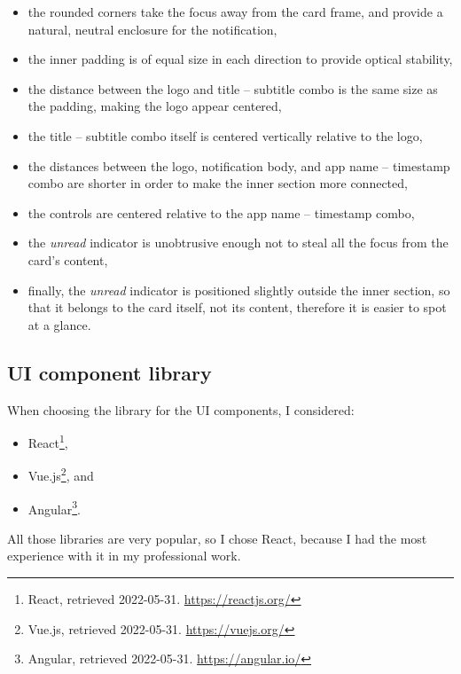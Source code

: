 \begin{itemize}
	\item
	      the rounded corners take the focus away from the card frame, and
	      provide a natural, neutral enclosure for the notification,
	\item
	      the inner padding is of equal size in each direction to provide
	      optical stability,
	\item
	      the distance between the logo and title -- subtitle combo is the same
	      size as the padding, making the logo appear centered,
	\item
	      the title -- subtitle combo itself is centered vertically relative to
	      the logo,
	\item
	      the distances between the logo, notification body, and app name --
	      timestamp combo are shorter in order to make the inner section more
	      connected,
	\item
	      the controls are centered relative to the app name -- timestamp combo,
	\item
	      the \emph{unread} indicator is unobtrusive enough not to steal all the
	      focus from the card's content,
	\item
	      finally, the \emph{unread} indicator is positioned slightly outside
	      the inner section, so that it belongs to the card itself, not its
	      content, therefore it is easier to spot at a glance.
\end{itemize}

\hypertarget{ui-component-library}{%
	\subsection{UI component library}\label{ui-component-library}}

When choosing the library for the UI components, I considered:

\begin{itemize}
	\item
	      React\footnote{React, retrieved 2022-05-31. \url{https://reactjs.org/}},
	\item
	      Vue.js\footnote{Vue.js, retrieved 2022-05-31. \url{https://vuejs.org/}},
	      and
	\item
	      Angular\footnote{Angular, retrieved 2022-05-31.
	      	\url{https://angular.io/}}.
\end{itemize}

All those libraries are very popular, so I chose React, because I had
the most experience with it in my professional work.

